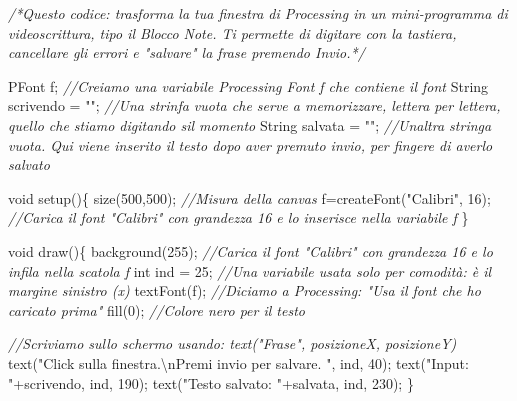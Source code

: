 \documentclass[
]{article}
\newenvironment{Shaded}{}{}
\newcommand{\BuiltInTok}[1]{\textcolor[rgb]{0.00,0.50,0.00}{#1}}
\newcommand{\CommentTok}[1]{\textcolor[rgb]{0.38,0.63,0.69}{\textit{#1}}}
\newcommand{\DataTypeTok}[1]{\textcolor[rgb]{0.56,0.13,0.00}{#1}}
\newcommand{\DecValTok}[1]{\textcolor[rgb]{0.25,0.63,0.44}{#1}}
\newcommand{\FunctionTok}[1]{\textcolor[rgb]{0.02,0.16,0.49}{#1}}
\newcommand{\NormalTok}[1]{#1}
\newcommand{\OperatorTok}[1]{\textcolor[rgb]{0.40,0.40,0.40}{#1}}
\newcommand{\SpecialCharTok}[1]{\textcolor[rgb]{0.25,0.44,0.63}{#1}}
\newcommand{\StringTok}[1]{\textcolor[rgb]{0.25,0.44,0.63}{#1}}
\begin{document}
\begin{Shaded}
\begin{Highlighting}[]
\CommentTok{/*Questo codice: trasforma la tua finestra di Processing in un mini{-}programma di videoscrittura, tipo il Blocco Note. Ti permette di digitare con la tastiera, cancellare gli errori e "salvare" la frase premendo Invio.*/}

\NormalTok{PFont f}\OperatorTok{;} \CommentTok{//Creiamo una variabile Processing Font \textquotesingle{}f\textquotesingle{} che contiene il font}
\BuiltInTok{String}\NormalTok{ scrivendo }\OperatorTok{=} \StringTok{""}\OperatorTok{;} \CommentTok{//Una strinfa vuota che serve a memorizzare, lettera per lettera, quello che stiamo digitando sil momento}
\BuiltInTok{String}\NormalTok{ salvata }\OperatorTok{=} \StringTok{""}\OperatorTok{;} \CommentTok{//Un\textquotesingle{}altra stringa vuota. Qui viene inserito il testo dopo aver premuto \textquotesingle{}invio\textquotesingle{}, per fingere di averlo salvato}

\DataTypeTok{void} \FunctionTok{setup}\OperatorTok{()\{}
  \FunctionTok{size}\OperatorTok{(}\DecValTok{500}\OperatorTok{,}\DecValTok{500}\OperatorTok{);} \CommentTok{//Misura della canvas                                            }
\NormalTok{  f}\OperatorTok{=}\FunctionTok{createFont}\OperatorTok{(}\StringTok{"Calibri"}\OperatorTok{,} \DecValTok{16}\OperatorTok{);} \CommentTok{//Carica il font "Calibri" con grandezza 16 e lo inserisce nella variabile f}
\OperatorTok{\}}

\DataTypeTok{void} \FunctionTok{draw}\OperatorTok{()\{}
  \FunctionTok{background}\OperatorTok{(}\DecValTok{255}\OperatorTok{);} \CommentTok{//Carica il font "Calibri" con grandezza 16 e lo infila nella scatola f}
  \DataTypeTok{int}\NormalTok{ ind }\OperatorTok{=} \DecValTok{25}\OperatorTok{;} \CommentTok{//Una variabile usata solo per comodità: è il margine sinistro (x)}
  \FunctionTok{textFont}\OperatorTok{(}\NormalTok{f}\OperatorTok{);} \CommentTok{//Diciamo a Processing: "Usa il font che ho caricato prima"}
  \FunctionTok{fill}\OperatorTok{(}\DecValTok{0}\OperatorTok{);} \CommentTok{//Colore nero per il testo}
    
  \CommentTok{//Scriviamo sullo schermo usando: \textquotesingle{}text("Frase", posizioneX, posizioneY)\textquotesingle{}}
  \FunctionTok{text}\OperatorTok{(}\StringTok{"Click sulla finestra.}\SpecialCharTok{\textbackslash{}n}\StringTok{Premi invio per salvare. "}\OperatorTok{,}\NormalTok{ ind}\OperatorTok{,} \DecValTok{40}\OperatorTok{);}
  \FunctionTok{text}\OperatorTok{(}\StringTok{"Input: "}\OperatorTok{+}\NormalTok{scrivendo}\OperatorTok{,}\NormalTok{ ind}\OperatorTok{,} \DecValTok{190}\OperatorTok{);}
  \FunctionTok{text}\OperatorTok{(}\StringTok{"Testo salvato: "}\OperatorTok{+}\NormalTok{salvata}\OperatorTok{,}\NormalTok{ ind}\OperatorTok{,} \DecValTok{230}\OperatorTok{);}
\OperatorTok{\}}


\end{Highlighting}
\end{Shaded}
\end{document}
